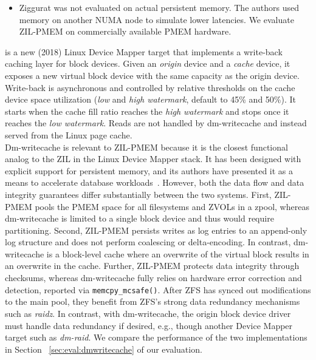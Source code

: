 \documentclass[12pt,a4paper,twoside]{book}
\begin{document}
\begin{itemize}[noitemsep,beginpenalty=100000,midpenalty=100000]
    \item Ziggurat was not evaluated on actual persistent memory. The authors used memory on another NUMA node to simulate lower latencies.
          We evaluate ZIL-PMEM on commercially available PMEM hardware.
\end{itemize}

 is a new (2018) Linux Device Mapper target that implements a write-back caching layer for block devices.
Given an \textit{origin} device and a \textit{cache} device, it exposes a new virtual block device with the same capacity as the origin device.
Write-back is asynchronous and controlled by relative thresholds on the cache device space utilization (\textit{low} and \textit{high watermark}, default to 45\% and 50\%).
It starts when the cache fill ratio reaches the \textit{high watermark} and stops once it reaches the \textit{low watermark}.
Reads are not handled by dm-writecache and instead served from the Linux page cache.~\cite{WritecacheTargetLinux}
\\
Dm-writecache is relevant to ZIL-PMEM because it is the closest functional analog to the ZIL in the Linux Device Mapper stack.
It has been designed with explicit support for persistent memory, and its authors have presented it as a means to accelerate database workloads~\cite{tadakamadlaAcceleratingDatabaseWorkloads2019}.
However, both the data flow and data integrity guarantees differ substantially between the two systems.
First, ZIL-PMEM pools the PMEM space for all filesystems and ZVOLs in a zpool, whereas dm-writecache is limited to a single block device and thus would require partitioning.
Second, ZIL-PMEM persists writes as log entries to an append-only log structure and does not perform coalescing or delta-encoding.
In contrast, dm-writecache is a block-level cache where an overwrite of the virtual block results in an overwrite in the cache.
Further, ZIL-PMEM protects data integrity through checksums, whereas dm-writecache fully relies on hardware error correction and detection, reported via \lstinline{memcpy_mcsafe()}.
After ZFS has synced out modifications to the main pool, they benefit from ZFS's strong data redundancy mechanisms such as \textit{raidz}.
In contrast, with dm-writecache, the origin block device driver must handle data redundancy if desired, e.g., though another Device Mapper target such as \textit{dm-raid}.
We compare the performance of the two implementations in Section ~\ref{sec:eval:dmwritecache} of our evaluation.
\end{document}
